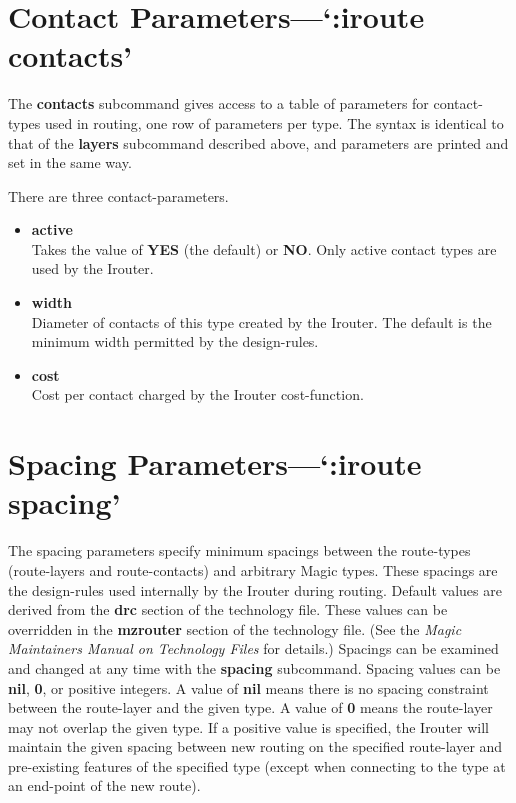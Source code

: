 \documentclass[letterpaper,twoside,12pt]{article}
\begin{document}
\section{Contact Parameters---`:iroute contacts'}

The {\bfseries contacts} subcommand gives access to a table of parameters for 
contact-types used in routing, one row of parameters per type.  The syntax is 
identical to that of the {\bfseries layers} subcommand described above, and 
parameters are printed and set in the same way.

There are three contact-parameters.

\begin{itemize}
   \item {\bfseries active} \\
	Takes the value of {\bfseries YES} (the default) or {\bfseries NO}.  Only
	active contact types are used by the Irouter.

   \item {\bfseries width} \\
	Diameter of contacts of this type created by the Irouter.  The
	default is the minimum width permitted by the design-rules.

   \item {\bfseries cost} \\
	Cost per contact charged by the Irouter cost-function.
\end{itemize}

\section{Spacing Parameters---`:iroute spacing'}

The spacing parameters specify minimum
spacings between the route-types
(route-layers and route-contacts) and arbitrary Magic types.
These spacings are the design-rules
used internally by the Irouter during routing.  Default
values are derived from the {\bfseries drc} section
of the technology file.  These values can be
overridden in the {\bfseries mzrouter} section of the 
technology file.  (See the {\itshape Magic Maintainers Manual on Technology Files}
for details.)  Spacings can be examined and changed at any
time with the {\bfseries spacing} subcommand.  Spacing values can
be {\bfseries nil}, {\bfseries 0}, or positive integers.  A value of {\bfseries nil}
means there is no spacing constraint between the route-layer and the given type.  A
value of {\bfseries 0} means the route-layer may not overlap the given type.  If
a positive value is specified, the Irouter will maintain the
given spacing between new routing on the specified 
route-layer and pre-existing features of the specified type (except when
connecting to the type at an end-point of the new route).
\end{document}

